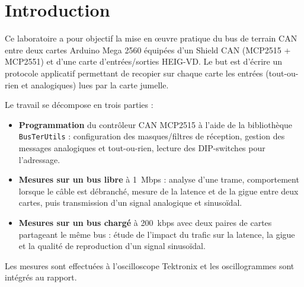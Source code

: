 \section{Introduction}

Ce laboratoire a pour objectif la mise en œuvre pratique du bus de terrain CAN
entre deux cartes Arduino Mega 2560 équipées d'un Shield CAN (MCP2515 +
MCP2551) et d'une carte d'entrées/sorties HEIG-VD. Le but est d'écrire un
protocole applicatif permettant de recopier sur chaque carte les entrées
(tout-ou-rien et analogiques) lues par la carte jumelle.

Le travail se décompose en trois parties :
\begin{itemize}
    \item \textbf{Programmation} du contrôleur CAN MCP2515 à l'aide de la
    bibliothèque \texttt{BusTerUtils} : configuration des masques/filtres de
    réception, gestion des messages analogiques et tout-ou-rien, lecture des
    DIP-switches pour l'adressage.
    \item \textbf{Mesures sur un bus libre} à \num{1}~Mbps : analyse d'une
    trame, comportement lorsque le câble est débranché, mesure de la latence
    et de la gigue entre deux cartes, puis transmission d'un signal
    analogique et sinusoïdal.
    \item \textbf{Mesures sur un bus chargé} à \num{200}~kbps avec deux paires
    de cartes partageant le même bus : étude de l'impact du trafic sur la
    latence, la gigue et la qualité de reproduction d'un signal sinusoïdal.
\end{itemize}

Les mesures sont effectuées à l'oscilloscope Tektronix et les oscillogrammes
sont intégrés au rapport.
